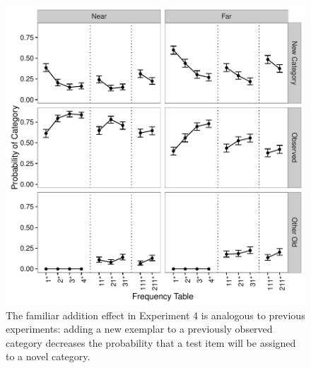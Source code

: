 \documentclass[doc]{apa6}
\begin{document}
\begin{figure}[t]
\begin{center}
\includegraphics[scale=.55]{exp4familiar.pdf}
\caption{The familiar addition effect in Experiment 4 is analogous to previous experiments: adding a new exemplar to a previously observed category decreases the probability that a test item will be assigned to a novel category.}
\label{fig:exp4familiar}
\end{center}
\end{figure}
\end{document}
